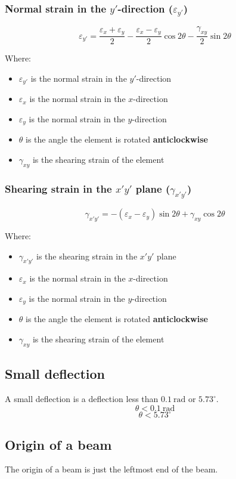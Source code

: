\documentclass[11pt]{article}
\begin{document}
\subsubsection{Normal strain in the \(y'\)-direction (\(\varepsilon_{y'}\))}
\label{sec:org02f5a24}
\[\varepsilon_{y'} = \frac{\varepsilon_x + \varepsilon_y}{2} - \frac{\varepsilon_x - \varepsilon_y}{2} \cos 2 \theta - \frac{\gamma_{xy}}{2} \sin 2 \theta\]

Where:
\begin{itemize}
\item \(\varepsilon_{y'}\) is the normal strain in the \(y'\)-direction
\item \(\varepsilon_{x}\) is the normal strain in the \(x\)-direction
\item \(\varepsilon_{y}\) is the normal strain in the \(y\)-direction
\item \(\theta\) is the angle the element is rotated \textbf{anticlockwise}
\item \(\gamma_{xy}\) is the shearing strain of the element
\end{itemize}
\subsubsection{Shearing strain in the \(x'y'\) plane (\(\gamma_{x'y'}\))}
\label{sec:org985c888}
\[\gamma_{x'y'} = - (\varepsilon_x - \varepsilon_y) \sin 2 \theta + \gamma_{xy} \cos 2 \theta\]

Where:
\begin{itemize}
\item \(\gamma_{x'y'}\) is the shearing strain in the \(x'y'\) plane
\item \(\varepsilon_{x}\) is the normal strain in the \(x\)-direction
\item \(\varepsilon_{y}\) is the normal strain in the \(y\)-direction
\item \(\theta\) is the angle the element is rotated \textbf{anticlockwise}
\item \(\gamma_{xy}\) is the shearing strain of the element
\end{itemize}
\subsection{Small deflection}
\label{sec:org618c396}
A small deflection is a deflection less than \(\qty{0.1}{\radian}\) or \(5.73^{\circ}\).
\[\theta < \qty{0.1}{\radian}\]
\[\theta < 5.73^{\circ}\]
\subsection{Origin of a beam}
\label{sec:org5a46dff}
The origin of a beam is just the leftmost end of the beam.
\end{document}
